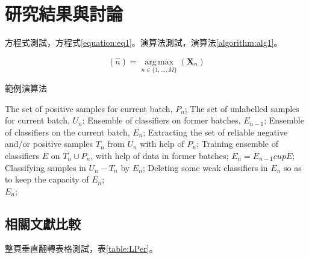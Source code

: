 \section{研究結果與討論}

方程式測試，方程式\ref{equation:eq1}。演算法測試，演算法\ref{algorithm:alg1}。

\begin{equation}[h]
    \label{equation:eq1}
    (\hat{n})=\operatorname*{arg\,max}_{n\in \{1,\dots,M\}}(\mathbf{X}_{n})
\end{equation}

\begin{algorithm}[htb]
    \caption{範例演算法}
    \label{algorithm:alg1}
    \begin{algorithmic}[1]
        \Require
        The set of positive samples for current batch, $P_n$;
        The set of unlabelled samples for current batch, $U_n$;
        Ensemble of classifiers on former batches, $E_{n-1}$;
        \Ensure
        Ensemble of classifiers on the current batch, $E_n$;
        \State Extracting the set of reliable negative and/or positive samples $T_n$ from $U_n$ with help of $P_n$;
        \label{code:fram:extract}
        \State Training ensemble of classifiers $E$ on $T_n \cup P_n$, with help of data in former batches;
        \label{code:fram:trainbase}
        \State $E_n=E_{n-1}cup E$;
        \label{code:fram:add}
        \State Classifying samples in $U_n-T_n$ by $E_n$;
        \label{code:fram:classify}
        \State Deleting some weak classifiers in $E_n$ so as to keep the capacity of $E_n$;
        \label{code:fram:select} \\
        \Return $E_n$;
    \end{algorithmic}
\end{algorithm}

\subsection{相關文獻比較}
整頁垂直翻轉表格測試，表\ref{table:LPer}。

